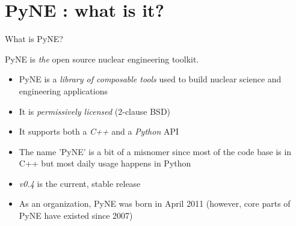 \documentclass[xcolor=x11names,compress]{beamer}
\renewcommand{\(}{\begin{columns}}
\renewcommand{\)}{\end{columns}}
\newcommand{\<}[1]{\begin{column}{#1}}
\renewcommand{\>}{\end{column}}
\begin{document}
\section{PyNE \cite{pyne}: what is it?}
\begin{frame}{What is PyNE?}

    PyNE is \textit{the} open source nuclear engineering toolkit.
    \vspace*{1em}
    \begin{itemize}
    \item PyNE is a \textit{library of composable tools} used to build 
    nuclear science and engineering applications
    \item It is \textit{permissively licensed} (2-clause BSD)
    \item It supports both a \textit{C++} and a \textit{Python} API
    \item The name 'PyNE' is a bit of a misnomer since most of the code 
    base is in C++ but most daily usage happens in Python
    \item \textit{v0.4} is the current, stable release
    \item As an organization, PyNE was born in April 2011 
    (however, core parts of PyNE have existed since 2007)
    \end{itemize}

\end{frame}
\end{document}
